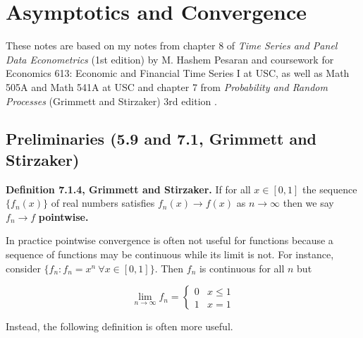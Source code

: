 %
%
%
%
%
%
%
%
%
%
%
%
%
%

\chapter{Asymptotics and Convergence}

These notes are based on my notes from chapter 8 of \textit{Time Series and Panel Data Econometrics} (1st edition) by M. Hashem Pesaran \citep{pesaran-2015-text} and coursework for Economics 613: Economic and Financial Time Series I at USC, as well as Math 505A and Math 541A at USC and chapter 7 from \textit{Probability and Random Processes} (Grimmett and Stirzaker) 3rd edition \citep{grimmett2001probability}.


\section{Preliminaries (5.9 and 7.1, Grimmett and Stirzaker)}
\label{asym.preliminaries}

\begin{definition} \textbf{Definition 7.1.4, Grimmett and Stirzaker.} If for all \(x \in [0, 1]\) the sequence \(\{f_n(x)\}\) of real numbers satisfies \(f_n(x) \to f(x)\) as \(n \to \infty\) then we say \(f_n \to f\) \textbf{pointwise.}
\end{definition} 

\begin{remark} In practice pointwise convergence is often not useful for functions because a sequence of functions may be continuous while its limit is not. For instance, consider \(\{f_n: f_n = x^n \ \forall x \in [0, 1]\}\). Then \(f_n\) is continuous for all \(n\) but

\[
\lim_{n \to \infty} f_n = \begin{cases}
0 & x \leq 1 \\
1 & x = 1
\end{cases}
\]

Instead, the following definition is often more useful. \end{remark}

